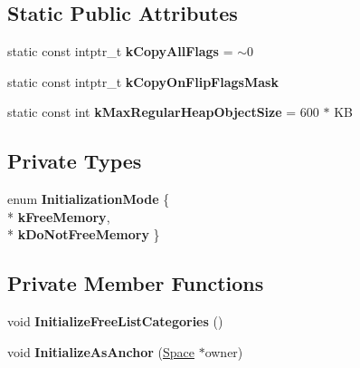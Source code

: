\subsection*{Static Public Attributes}
\begin{DoxyCompactItemize}
\item 
static const intptr\+\_\+t {\bfseries k\+Copy\+All\+Flags} = $\sim$0\hypertarget{classv8_1_1internal_1_1_page_a4706616a29ca61e97ec0885363e126a5}{}\label{classv8_1_1internal_1_1_page_a4706616a29ca61e97ec0885363e126a5}

\item 
static const intptr\+\_\+t {\bfseries k\+Copy\+On\+Flip\+Flags\+Mask}
\item 
static const int {\bfseries k\+Max\+Regular\+Heap\+Object\+Size} = 600 $\ast$ KB\hypertarget{classv8_1_1internal_1_1_page_aa46865a867b7145a2ac1f0679085adc9}{}\label{classv8_1_1internal_1_1_page_aa46865a867b7145a2ac1f0679085adc9}

\end{DoxyCompactItemize}
\subsection*{Private Types}
\begin{DoxyCompactItemize}
\item 
enum {\bfseries Initialization\+Mode} \{ \\*
{\bfseries k\+Free\+Memory}, 
\\*
{\bfseries k\+Do\+Not\+Free\+Memory}
 \}\hypertarget{classv8_1_1internal_1_1_page_a32f3cce4b8bf2b4a02eac08f9669dd66}{}\label{classv8_1_1internal_1_1_page_a32f3cce4b8bf2b4a02eac08f9669dd66}

\end{DoxyCompactItemize}
\subsection*{Private Member Functions}
\begin{DoxyCompactItemize}
\item 
void {\bfseries Initialize\+Free\+List\+Categories} ()\hypertarget{classv8_1_1internal_1_1_page_a40597daee0de4f3871eecd0611782b6f}{}\label{classv8_1_1internal_1_1_page_a40597daee0de4f3871eecd0611782b6f}

\item 
void {\bfseries Initialize\+As\+Anchor} (\hyperlink{classv8_1_1internal_1_1_space}{Space} $\ast$owner)\hypertarget{classv8_1_1internal_1_1_page_acc84b05efd7bb59a59809aee57b76e01}{}\label{classv8_1_1internal_1_1_page_acc84b05efd7bb59a59809aee57b76e01}

\end{DoxyCompactItemize}

